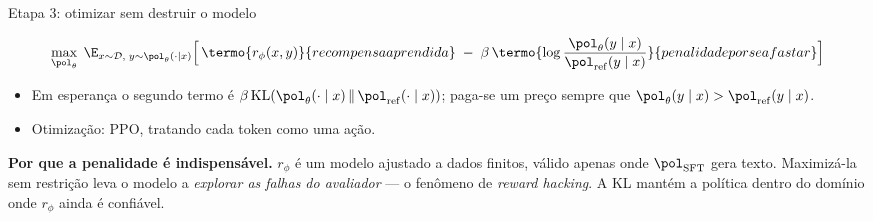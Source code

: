 \documentclass[aspectratio=169, 11pt]{beamer}
\newcommand{\thv}{\theta}
\newcommand{\polth}{\pol_{\thv}}                 %
\newcommand{\pref}{\pol_{\mathrm{ref}}}          %
\newcommand{\psft}{\pol_{\mathrm{SFT}}}          %
\newcommand{\rphi}{r_{\phi}}                     %
\newcommand{\Dset}{\mathcal{D}}
\newcommand{\KLd}[2]{\mathrm{KL}\!\left(#1 \,\middle\|\, #2\right)}
\begin{document}
\begin{frame}{Etapa 3: otimizar sem destruir o modelo}

  \[
    \max_{\polth}\;
      \E_{x\sim\Dset,\; y\sim\polth(\cdot\mid x)}
      \Bigl[\, \termo{\rphi(x,y)}{recompensa aprendida}
        \;-\; \beta\, \termo{\log \frac{\polth(y\mid x)}{\pref(y\mid x)}}{
          penalidade por se afastar} \Bigr]
  \]

  \begin{itemize}\setlength{\itemsep}{0.3ex}
    \item Em esperança o segundo termo é
      $\beta\,\KLd{\polth(\cdot\mid x)}{\pref(\cdot\mid x)}$; paga-se um preço
      sempre que $\polth(y\mid x) > \pref(y\mid x)$.
    \item Otimização: PPO, tratando cada token como uma ação.
  \end{itemize}

  \begin{alertabox}
    \textbf{Por que a penalidade é indispensável.} $\rphi$ é um modelo ajustado a
    dados finitos, válido apenas onde $\psft$ gera texto. Maximizá-la sem
    restrição leva o modelo a \emph{explorar as falhas do avaliador} --- o
    fenômeno de \emph{reward hacking}. A KL mantém a política dentro do domínio
    onde $\rphi$ ainda é confiável.
  \end{alertabox}
\end{frame}
\end{document}
